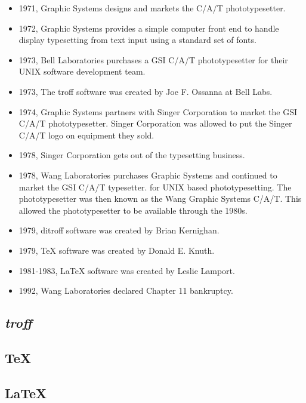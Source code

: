 \documentclass[12pt,letterpaper,titlepage,oneside,openright]{book}
\newcommand{\OhTeX}{%
    \makebox[0.76em][c]{O}%
    \makebox[0.25em][c]{%
        \raisebox{0.14em}[0em][0em]{%
            \fontsize{0.5em}{0cm}%
                \selectfont H%
        }%
    }%
    \makebox[1.35em][c]{\TeX}%
}
\newcommand{\ohtex}{\OhTeX\xspace}
\begin{document}
\begin{itemize}

\item 1971, Graphic Systems designs and markets the C/A/T phototypesetter.
\item 1972, Graphic Systems provides a simple computer front end to handle display typesetting from text input using a standard set of fonts.
\item 1973, Bell Laboratories purchases a GSI C/A/T phototypesetter for their UNIX software development team.
\item 1973, The troff software was created by Joe F. Ossanna at Bell Labs.
\item 1974, Graphic Systems partners with Singer Corporation to market the GSI C/A/T phototypesetter. Singer Corporation was allowed to put the Singer C/A/T logo on equipment they sold.
\item 1978, Singer Corporation gets out of the typesetting business.
\item 1978, Wang Laboratories purchases Graphic Systems and continued to market the GSI C/A/T typesetter. for UNIX based phototypesetting. The phototypesetter was then known as the Wang Graphic Systems C/A/T. This allowed the phototypesetter to be available through the 1980s.
\item 1979, ditroff software was created by Brian Kernighan.
\item 1979, TeX software was created by Donald E. Knuth.
\item 1981-1983, LaTeX software was created by Leslie Lamport.
\item 1992, Wang Laboratories declared Chapter 11 bankruptcy.
\end{itemize}

\subsection{\textit{troff}}
\lipsum[1-2]
\subsection{\TeX}
\lipsum[1-2]
\subsection{\LaTeX}
\lipsum[1-2]
\subsection[OhTeX]{\ohtex}
\lipsum[1-2]
\end{document}

